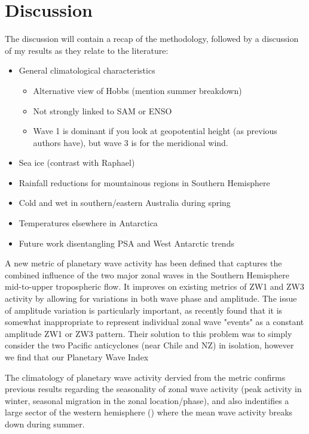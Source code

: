 \section{Discussion}

The discussion will contain a recap of the methodology, followed by a discussion of my results as they relate to the literature:
\begin{itemize}
\item General climatological characteristics
\begin{itemize}
\item Alternative view of Hobbs (mention summer breakdown)
\item Not strongly linked to SAM or ENSO
\item Wave 1 is dominant if you look at geopotential height (as previous authors have), but wave 3 is for the meridional wind.
\end{itemize}
\item Sea ice (contrast with Raphael)
\item Rainfall reductions for mountainous regions in Southern Hemisphere
\item Cold and wet in southern/eastern Australia during spring
\item Temperatures elsewhere in Antarctica
\item Future work disentangling PSA and West Antarctic trends
\end{itemize}

A new metric of planetary wave activity has been defined that captures the combined influence of the two major zonal waves in the Southern Hemisphere mid-to-upper tropospheric flow. It improves on existing metrics of ZW1 and ZW3 activity by allowing for variations in both wave phase and amplitude. The issue of amplitude variation is particularly important, as \citet{Hobbs2010} recently found that it is somewhat inappropriate to represent individual zonal wave "events" as a constant amplitude ZW1 or ZW3 pattern. Their solution to this problem was to simply consider the two Pacific anticyclones (near Chile and NZ) in isolation, however we find that our Planetary Wave Index 

The climatology of planetary wave activity dervied from the metric confirms previous results regarding the seasonality of zonal wave activity (peak activity in winter, seasonal migration in the zonal location/phase), and also indentifies a large sector of the western hemisphere () where the mean wave activity breaks down during summer. 







